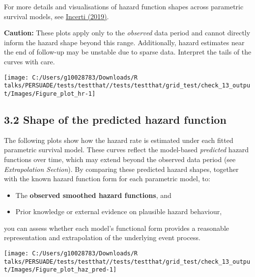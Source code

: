 \documentclass[
]{article}
\providecommand{\tightlist}{%
  \setlength{\itemsep}{0pt}\setlength{\parskip}{0pt}}
\begin{document}
For more details and visualisations of hazard function shapes across
parametric survival models, see
\href{https://devinincerti.com/2019/06/18/parametric_survival.html}{Incerti
(2019)}.

\textbf{Caution:} These plots apply only to the \emph{observed} data
period and cannot directly inform the hazard shape beyond this range.
Additionally, hazard estimates near the end of follow-up may be unstable
due to sparse data. Interpret the tails of the curves with care.

\clearpage

\begin{flushleft}\texttt{[image: C:/Users/g10028783/Downloads/R talks/PERSUADE/tests/testthat//tests/testthat/grid\_test/check\_13\_output/Images/Figure\_plot\_hr-1]} \end{flushleft}

\clearpage

\subsection{3.2 Shape of the predicted hazard
function}\label{shape-of-the-predicted-hazard-function}

The following plots show how the hazard rate is estimated under each
fitted parametric survival model. These curves reflect the model-based
\emph{predicted} hazard functions over time, which may extend beyond the
observed data period (see \emph{Extrapolation Section}). By comparing
these predicted hazard shapes, together with the known hazard function
form for each parametric model, to:

\begin{itemize}
\tightlist
\item
  The \textbf{observed smoothed hazard functions}, and\\
\item
  Prior knowledge or external evidence on plausible hazard behaviour,
\end{itemize}

you can assess whether each model's functional form provides a
reasonable representation and extrapolation of the underlying event
process.

\clearpage

\begin{flushleft}\texttt{[image: C:/Users/g10028783/Downloads/R talks/PERSUADE/tests/testthat//tests/testthat/grid\_test/check\_13\_output/Images/Figure\_plot\_haz\_pred-1]} \end{flushleft}
\end{document}
